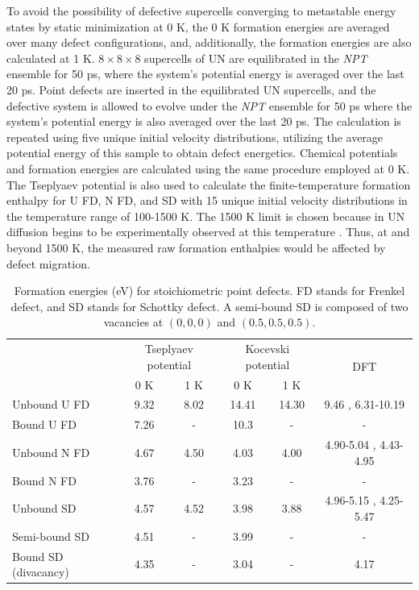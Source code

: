 \documentclass[preprint, 12pt]{elsarticle}
\begin{document}
To avoid the possibility of defective supercells converging to metastable energy states by static minimization at 0 K, the 0 K formation energies are averaged over many defect configurations, and, additionally, the formation energies are also calculated at 1 K. $8 \times 8 \times 8$ supercells of UN are equilibrated in the \textit{NPT} ensemble for 50 ps, where the system's potential energy is averaged over the last 20 ps. Point defects are inserted in the equilibrated UN supercells, and the defective system is allowed to evolve under the \textit{NPT} ensemble for 50 ps where the system's potential energy is also averaged over the last 20 ps. The calculation is repeated using five unique initial velocity distributions, utilizing the average potential energy of this sample to obtain defect energetics. Chemical potentials and formation energies are calculated using the same procedure employed at 0 K. The Tseplyaev potential is also used to calculate the finite-temperature formation enthalpy for U FD, N FD, and SD with 15 unique initial velocity distributions in the temperature range of 100-1500 K. The 1500 K limit is chosen because in UN diffusion begins to be experimentally observed at this temperature \cite{Hayes1990III}. Thus, at and beyond 1500 K, the measured raw formation enthalpies would be affected by defect migration.

\begin{table}[h!]
    \centering
    \footnotesize
    \caption{Formation energies (eV) for stoichiometric point defects. FD stands for Frenkel defect, and SD stands for Schottky defect. A semi-bound SD is composed of two vacancies at $(0, 0, 0)$ and $(0.5, 0.5, 0.5)$.}
    \label{Tab:StoicDef}
    \begin{tabular}{l|cc|cc|c}
    \hline
                & \multicolumn{2}{c|}{Tseplyaev potential}            & \multicolumn{2}{c|}{Kocevski potential}  & \multirow{2}{*}{DFT} \\
& 0 K & 1 K & 0 K & 1 K & \\
\hline
Unbound U FD            & 9.32   & 8.02            & 14.41  & 14.30 & 9.46 \cite{Yang2021}, 6.31-10.19 \cite{Kocevski2022I} \\
Bound U FD              & 7.26   & -               & 10.3   & -     & - \\
Unbound N FD            & 4.67   & 4.50            & 4.03   & 4.00  & 4.90-5.04 \cite{Yang2021}, 4.43-4.95 \cite{Kocevski2022I} \\
Bound N FD              & 3.76   & -               & 3.23   & -     & - \\
Unbound SD              & 4.57   & 4.52            & 3.98   & 3.88  & 4.96-5.15 \cite{Yang2021}, 4.25-5.47 \cite{Kocevski2022I} \\
Semi-bound SD           & 4.51   & -               & 3.99   & -     & - \\
Bound SD (divacancy)    & 4.35   & -               & 3.04   & -     & 4.17 \cite{Yang2021} \\
    \hline
    \end{tabular}
\end{table}
\end{document}
